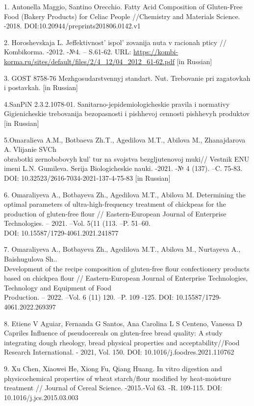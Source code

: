 \begin{references}

1. Antonella Maggio, Santino Orecchio. Fatty Acid Composition of
Gluten-Free Food (Bakery Products) for Celiac People //Chemistry and
Materials Science. -2018. DOI:10.20944/preprints201806.0142.v1

2. Horoshevskaja L. Jeffektivnost'{}
ispol' zovanija nuta v racionah pticy // Kombikorma.
-2012. -№4. -- S.61-62. URL:
\url{https://kombi-korma.ru/sites/default/files/2/4_12/04_2012_61-62.pdf}
{[}in Russian{]}

3. GOST 8758-76 Mezhgosudarstvennyj standart. Nut. Trebovanie pri
zagatovkah i postavkah. {[}in Russian{]}

4.SanPiN 2.3.2.1078-01. Sanitarno-jepidemiologicheskie pravila i
normativy Gigienicheskie trebovanija bezopasnosti i pishhevoj cennosti
pishhevyh produktov {[}in Russian{]}

5.Omaralieva A.M., Botbaeva Zh.T., Agedilova M.T., Abilova M.,
Zhanajdarova A. Vlijanie SVCh \\obrabotki zernobobovyh
kul' tur na svojstva bezgljutenovoj muki// Vestnik ENU
imeni L.N. Gumileva. Serija Biologicheskie nauki. -2021. -№ 4 (137).
--C. 75-83. DOI: 10.32523/2616-7034-2021-137-4-75-83 {[}in Russian{]}

6. Omaraliyeva A., Botbayeva Zh., Agedilova M.T., Abilova M. Determining
the optimal parameters of ultra-high-frequency treatment of chickpeas
for the production of gluten-free flour // Eastern-European Journal of
Enterprise Technologies. -- 2021. --Vol. 5(11 (113. --P. 51--60. \\DOI:
10.15587/1729-4061.2021.241877

7. Omaraliyeva A., Botbayeva Zh., Agedilova M.T., Abilova M., Nurtayeva
A., Baishugulova Sh.. \\Development of the recipe composition of
gluten-free flour confectionery products based on chickpea flour //
Eastern-European Journal of Enterprise Technologies, Technology and
Equipment of Food\\ Production. -- 2022. --Vol. 6 (11) 120. --P. 109 -125.
DOI: 10.15587/1729-4061.2022.269397

8. Etiene V Aguiar, Fernanda G Santos, Ana Carolina L S Centeno, Vanessa
D Capriles Influence of pseudocereals on gluten-free bread quality: A
study integrating dough rheology, bread physical properties and
acceptability//Food Research International. - 2021, Vol. 150. DOI:
10.1016/j.foodres.2021.110762

9. Xu Chen, Xiaowei He, Xiong Fu, Qiang Huang. In vitro digestion and
physicochemical properties of wheat starch/flour modified by
heat-moisture treatment // Journal of Cereal Science. -2015.-Vol 63. -R.
109-115. DOI: 10.1016/j.jcs.2015.03.003


\end{references}
